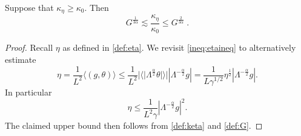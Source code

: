 \documentclass[10pt,a4paper]{amsart}
\newcommand{\ga}{\gamma}
\newcommand{\kap}{\kappa}
\newcommand{\ka}{\kappa}
\newcommand{\la}{\Lambda}
\newcommand{\te}{\theta}
\begin{document}
\begin{proposition} \label{prop:keta_G}
{Suppose that $\kap_\eta\geq\kap_0$. Then}
    \begin{equation}\label{bounds:kaeta}
        G^{\frac{1}{3\alpha}} \lesssim \frac{\kappa_{\eta}}{\ka_0} \le G^{\frac{2}{3\alpha}}\;.
    \end{equation}
\end{proposition}

\begin{proof}
{Recall $\eta$ as defined in \eqref{def:eta}}. We revisit \eqref{ineq:etaineq} to {alternatively estimate} 
    \begin{equation} \label{ineq:etaineq2}
        \eta = \frac{1}{L^2} \langle (g, \te) \rangle \le \frac{1}{L^2} |\langle|\la^{\frac{\alpha}{2}}\te|\rangle| |\la^{-\frac{\alpha}{2}}g| 
        = \frac{1}{L\ga^{1/2}} \eta^{\frac{1}{2}} |\la^{-\frac{\alpha}{2}}g| .
    \end{equation}
{In particular}
     \begin{equation} \label{ineq:etahalf}
        \eta \le \frac{1}{L^2 \ga} |\la^{-\frac{\alpha}{2}}g|^2.
    \end{equation}
{The claimed upper bound then follows from \eqref{def:keta} and \eqref{def:G}.}
    

\end{proof}
\end{document}
